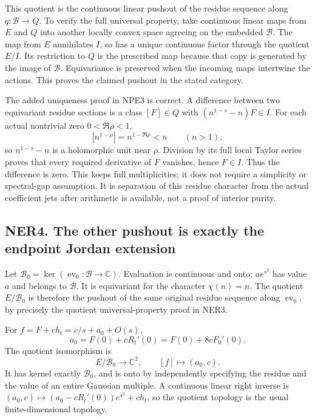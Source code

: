 This quotient is the continuous linear pushout of the residue sequence
along \(q:\mathcal B\to Q\). To verify the full universal property, take
continuous linear maps from \(E\) and \(Q\) into another locally convex
space agreeing on the embedded \(\mathcal B\). The map from \(E\)
annihilates \(I\), so has a unique continuous factor through the
quotient \(E/I\). Its restriction to \(Q\) is the prescribed map because
that copy is generated by the image of \(\mathcal B\). Equivariance is
preserved when the incoming maps intertwine the actions. This proves the
claimed pushout in the stated category.

The added uniqueness proof in NPE3 is correct. A difference between two
equivariant residue sections is a class \([F]\in Q\) with
\((n^{1-s}-n)F\in I\). For each actual nontrivial zero \(0<\Re\rho<1\),
\[
|n^{1-\rho}|=n^{1-\Re\rho}<n\qquad(n>1),
\] so \(n^{1-s}-n\) is a holomorphic unit near \(\rho\). Division by its
full local Taylor series proves that every required derivative of \(F\)
vanishes, hence \(F\in I\). Thus the difference is zero. This keeps full
multiplicities; it does not require a simplicity or spectral-gap
assumption. It is separation of this residue character from the actual
coefficient jets after arithmetic is available, not a proof of interior
purity.

\subsection{NER4. The other pushout is exactly the endpoint Jordan
extension}\label{ner4.-the-other-pushout-is-exactly-the-endpoint-jordan-extension}

Let \(\mathcal B_0=\ker(\operatorname{ev}_0:\mathcal B\to\mathbb C)\).
Evaluation is continuous and onto: \(a e^{s^2}\) has value \(a\) and
belongs to \(\mathcal B\). It is equivariant for the character
\(\chi(n)=n\). The quotient \(E/\mathcal B_0\) is therefore the pushout
of the same original residue sequence along \(\operatorname{ev}_0\), by
precisely the quotient universal-property proof in NER3.

For \(f=F+ch_t=c/s+a_0+O(s)\), \[
a_0=F(0)+cR_t'(0)=F(0)+8cF_0'(0).
\tag{NER4.1}
\] The quotient isomorphism is \[
E/\mathcal B_0\longrightarrow\mathbb C^2,
\qquad[f]\longmapsto(a_0,c).
\tag{NER4.2}
\] It has kernel exactly \(\mathcal B_0\), and is onto by independently
specifying the residue and the value of an entire Gaussian multiple. A
continuous linear right inverse is
\((a_0,c)\mapsto(a_0-cR_t'(0))e^{s^2}+ch_t\), so the quotient topology
is the usual finite-dimensional topology.

